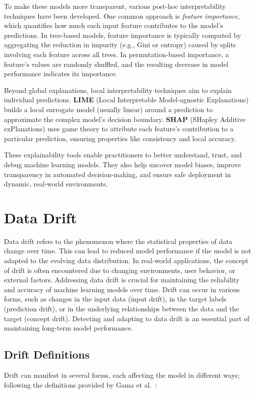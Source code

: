 To make these models more transparent, various post-hoc interpretability
techniques have been developed. One common approach is \emph{feature
    importance}, which quantifies how much each input feature contributes to the
model's predictions. In tree-based models, feature importance is typically
computed by aggregating the reduction in impurity (e.g., Gini or entropy)
caused by splits involving each feature across all trees. In permutation-based
importance, a feature's values are randomly shuffled, and the resulting
decrease in model performance indicates its importance.

Beyond global explanations, local interpretability techniques aim to explain
individual predictions. \textbf{LIME} (Local Interpretable Model-agnostic
Explanations) builds a local surrogate model (usually linear) around a
prediction to approximate the complex model's decision boundary. \textbf{SHAP}
(SHapley Additive exPlanations) uses game theory to attribute each feature's
contribution to a particular prediction, ensuring properties like consistency
and local accuracy.

These explainability tools enable practitioners to better understand, trust,
and debug machine learning models. They also help uncover model biases, improve
transparency in automated decision-making, and ensure safe deployment in
dynamic, real-world environments.

\section{Data Drift}\label{sec:data_drift}
Data drift refers to the phenomenon where the statistical properties of data
change over time. This can lead to reduced model performance if the model is
not adapted to the evolving data distribution. In real-world applications, the
concept of drift is often encountered due to changing environments, user
behavior, or external factors. Addressing data drift is crucial for maintaining
the reliability and accuracy of machine learning models over time. Drift can
occur in various forms, such as changes in the input data (input drift), in the
target labels (prediction drift), or in the underlying relationships between
the data and the target (concept drift). Detecting and adapting to data drift
is an essential part of maintaining long-term model performance.

\subsection*{Drift Definitions}\label{subsec:drift_definitions}
Drift can manifest in several forms, each affecting the model in different
ways; following the definitions provided by Gama et
al.~\cite{drift_adaptation_survey}:

